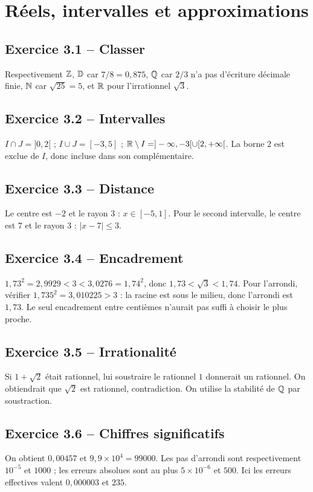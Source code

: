 \chapter{Réels, intervalles et approximations}
\section*{Exercice 3.1 -- Classer}
Respectivement $\mathbb{Z}$, $\mathbb{D}$ car $7/8=0{,}875$, $\mathbb{Q}$ car $2/3$ n'a pas d'écriture décimale finie, $\mathbb{N}$ car $\sqrt{25}=5$, et $\mathbb{R}$ pour l'irrationnel $\sqrt3$.

\section*{Exercice 3.2 -- Intervalles}
$I\cap J=]0,2[$ ; $I\cup J=[-3,5]$ ; $\mathbb{R}\setminus I=]-\infty,-3[\cup[2,+\infty[$. La borne $2$ est exclue de $I$, donc incluse dans son complémentaire.

\section*{Exercice 3.3 -- Distance}
Le centre est $-2$ et le rayon $3$ : $x\in[-5,1]$. Pour le second intervalle, le centre est $7$ et le rayon $3$ : $|x-7|\leq3$.

\section*{Exercice 3.4 -- Encadrement}
$1{,}73^2=2{,}9929<3<3{,}0276=1{,}74^2$, donc $1{,}73<\sqrt3<1{,}74$. Pour l'arrondi, vérifier $1{,}735^2=3{,}010225>3$ : la racine est sous le milieu, donc l'arrondi est $1{,}73$. Le seul encadrement entre centièmes n'aurait pas suffi à choisir le plus proche.

\section*{Exercice 3.5 -- Irrationalité}
Si $1+\sqrt2$ était rationnel, lui soustraire le rationnel $1$ donnerait un rationnel. On obtiendrait que $\sqrt2$ est rationnel, contradiction. On utilise la stabilité de $\mathbb{Q}$ par soustraction.

\section*{Exercice 3.6 -- Chiffres significatifs}
On obtient $0{,}00457$ et $9{,}9\times10^4=99000$. Les pas d'arrondi sont respectivement $10^{-5}$ et $1000$ ; les erreurs absolues sont au plus $5\times10^{-6}$ et $500$. Ici les erreurs effectives valent $0{,}000003$ et $235$.
